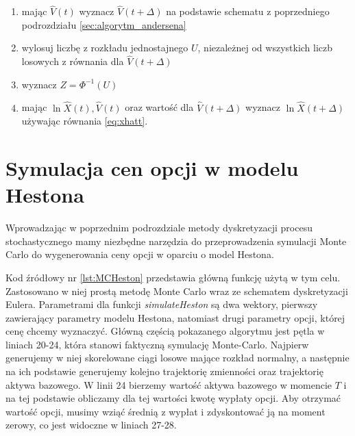 \documentclass{pracamgr}
\begin{document}
\begin{enumerate}
  \item mając $\hat{V}(t)$ wyznacz $\hat{V}(t + \Delta)$ na podstawie schematu z poprzedniego podrozdziału \ref{sec:algorytm_andersena}
  \item wylosuj liczbę z rozkładu jednostajnego $U$, niezależnej od wszystkich liczb losowych z równania dla $\hat{V}(t + \Delta)$
  \item wyznacz $Z = \Phi^{-1}(U)$
  \item mając $\ln \hat{X}(t), \hat{V}(t)$ oraz wartość dla $\hat{V}(t + \Delta)$ wyznacz $\ln \hat{X} (t+\Delta)$ używając równania \ref{eq:xhatt}.
\end{enumerate}


\section{Symulacja cen opcji w modelu Hestona}

Wprowadzając w poprzednim podrozdziale metody dyskretyzacji procesu stochastycznego mamy niezbędne 
narzędzia do przeprowadzenia symulacji Monte Carlo do wygenerowania ceny opcji w oparciu o model 
Hestona.




Kod źródłowy nr \ref{lst:MCHeston} przedstawia główną funkcję użytą w tym celu. 
Zastosowano w niej prostą metodę Monte Carlo wraz ze schematem dyskretyzacji Eulera. 
Parametrami dla funkcji \textit{simulateHeston} są dwa wektory, pierwszy zawierający
parametry modelu Hestona, natomiast drugi parametry opcji, której cenę chcemy wyznaczyć. 
Główną częścią pokazanego algorytmu jest pętla w liniach 20-24, która stanowi faktyczną symulację
Monte-Carlo. Najpierw generujemy w niej skorelowane ciągi losowe mające rozkład normalny, 
a następnie na ich podstawie generujemy kolejno trajektorię zmienności oraz trajektorię aktywa
bazowego. W linii 24 bierzemy wartość aktywa bazowego w momencie $T$ i na tej podstawie obliczamy dla
tej wartości kwotę wypłaty opcji. Aby otrzymać wartość opcji, musimy wziąć średnią z wypłat i
zdyskontować ją na moment zerowy, co jest widoczne w liniach 27-28.


\end{document}
